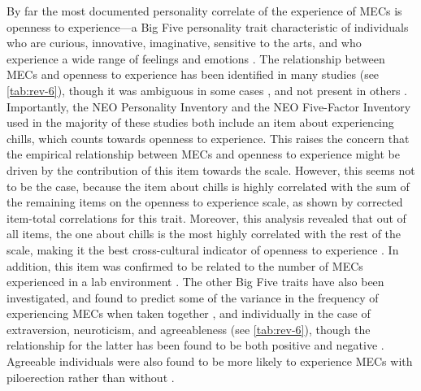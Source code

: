 By far the most documented personality correlate of the experience of MECs is openness to experience---a Big Five personality trait characteristic of individuals who are curious, innovative, imaginative, sensitive to the arts, and who experience a wide range of feelings and emotions \parencite{mccrae2007}. The relationship between MECs and openness to experience has been identified in many studies (see \autoref{tab:rev-6}), though it was ambiguous in some cases \parencite{mori2015, sumpf2015}, and not present in others \parencite{mathis2017, rickard2004, starcke2019}. Importantly, the NEO Personality Inventory and the NEO Five-Factor Inventory \parencite{costa1992} used in the majority of these studies both include an item about experiencing chills, which counts towards openness to experience. This raises the concern that the empirical relationship between MECs and openness to experience might be driven by the contribution of this item towards the scale. However, this seems not to be the case, because the item about chills is highly correlated with the sum of the remaining items on the openness to experience scale, as shown by corrected item-total correlations for this trait. Moreover, this analysis revealed that out of all items, the one about chills is the most highly correlated with the rest of the scale, making it the best cross-cultural indicator of openness to experience \parencite{mccrae2007}. In addition, this item was confirmed to be related to the number of MECs experienced in a lab environment \parencite{colver2016}. The other Big Five traits have also been investigated, and found to predict some of the variance in the frequency of experiencing MECs when taken together \parencite{nusbaum2011, silvia2011}, and individually in the case of extraversion, neuroticism, and agreeableness (see \autoref{tab:rev-6}), though the relationship for the latter has been found to be both positive \parencite{sumpf2015, williams2018} and negative \parencite{maruskin2012}. Agreeable individuals were also found to be more likely to experience MECs with piloerection rather than without \parencite{sumpf2015}.

